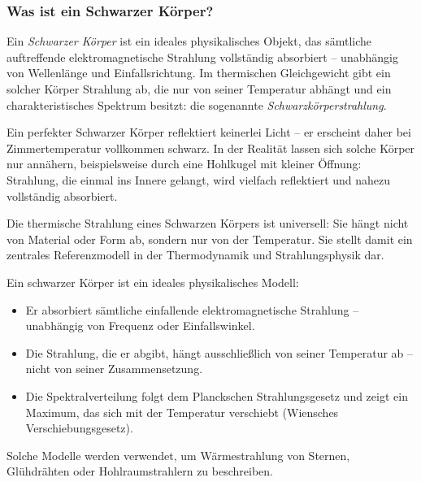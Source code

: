 \subsubsection{Was ist ein Schwarzer Körper?}

Ein \emph{Schwarzer Körper} ist ein ideales physikalisches Objekt, das sämtliche auftreffende elektromagnetische Strahlung vollständig absorbiert – unabhängig von Wellenlänge und Einfallsrichtung. Im thermischen Gleichgewicht gibt ein solcher Körper Strahlung ab, die nur von seiner Temperatur abhängt und ein charakteristisches Spektrum besitzt: die sogenannte \emph{Schwarzkörperstrahlung}.

Ein perfekter Schwarzer Körper reflektiert keinerlei Licht – er erscheint daher bei Zimmertemperatur vollkommen schwarz. In der Realität lassen sich solche Körper nur annähern, beispielsweise durch eine Hohlkugel mit kleiner Öffnung: Strahlung, die einmal ins Innere gelangt, wird vielfach reflektiert und nahezu vollständig absorbiert.

Die thermische Strahlung eines Schwarzen Körpers ist universell: Sie hängt nicht von Material oder Form ab, sondern nur von der Temperatur. Sie stellt damit ein zentrales Referenzmodell in der Thermodynamik und Strahlungsphysik dar.
\newpage
\noindent
\medskip
\begin{tcolorbox}[colback=blue!5!white, colframe=blue!50!black, title=Was ist ein schwarzer Körper?]
	\label{box:schwarzerkoerper}
	Ein schwarzer Körper ist ein ideales physikalisches Modell:
	
	\begin{itemize}
		\item Er absorbiert sämtliche einfallende elektromagnetische Strahlung – unabhängig von Frequenz oder Einfallswinkel.
		\item Die Strahlung, die er abgibt, hängt ausschließlich von seiner Temperatur ab – nicht von seiner Zusammensetzung.
		\item Die Spektralverteilung folgt dem Planckschen Strahlungsgesetz und zeigt ein Maximum, das sich mit der Temperatur verschiebt (Wiensches Verschiebungsgesetz).
	\end{itemize}
	
	Solche Modelle werden verwendet, um Wärmestrahlung von Sternen, Glühdrähten oder Hohlraumstrahlern zu beschreiben.
\end{tcolorbox}

